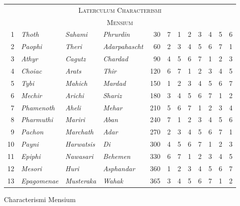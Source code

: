 %
\begin{tabnums} %
\normalsize
\centering
\renewcommand{\arraystretch}{1.0278} %
\newcommand{\hts}{\scriptsize}
\newcommand{\cwd}{4em}
%
\newcommand{\da}{\scriptsize{†}}
\begin{tabular}{@{} r lll r @{\hspace{2em}} ccccccc @{}}
\toprule
\multicolumn{12}{c}{\Large\textsc{Laterculum Characterismi}} \\
\multicolumn{12}{c}{\large\textsc{Mensium}} \\
\toprule
 1&\itshape Thoth      & \itshape Sahami     & \itshape Phrurdin
    &  30 & 7 & 1 & 2 & 3 & 4 & 5 & 6 \\
 2&\itshape Paophi     & \itshape Theri      & \itshape Adarpahascht
    &  60 & 2 & 3 & 4 & 5 & 6 & 7 & 1 \\
 3&\itshape Athyr      & \itshape Cagutz     & \itshape Chardad
    &  90 & 4 & 5 & 6 & 7 & 1 & 2 & 3 \\

 4&\itshape Choiac     & \itshape Arats      & \itshape Thir
    & 120 & 6 & 7 & 1 & 2 & 3 & 4 & 5 \\
 5&\itshape Tybi       & \itshape Mahich     & \itshape Mardad
    & 150 & 1 & 2 & 3 & 4 & 5 & 6 & 7 \\
 6&\itshape Mechir     & \itshape Arichi     & \itshape Shariz
    & 180 & 3 & 4 & 5 & 6 & 7 & 1 & 2 \\

 7&\itshape Phamenoth  & \itshape Aheli      & \itshape Mehar
    & 210 & 5 & 6 & 7 & 1 & 2 & 3 & 4 \\
 8&\itshape Pharmuthi  & \itshape Mariri     & \itshape Aban
    & 240 & 7 & 1 & 2 & 3 & 4 & 5 & 6 \\
 9&\itshape Pachon     & \itshape Marchath   & \itshape Adar
    & 270 & 2 & 3 & 4 & 5 & 6 & 7 & 1 \\

10&\itshape Payni      & \itshape Harwatsis  & \itshape Di
    & 300 & 4 & 5 & 6 & 7 & 1 & 2 & 3 \\
11&\itshape Epiphi     & \itshape Nawasari   & \itshape Behemen
    & 330 & 6 & 7 & 1 & 2 & 3 & 4 & 5 \\
12&\itshape Mesori     & \itshape Huri       & \itshape Asphandar
    & 360 & 1 & 2 & 3 & 4 & 5 & 6 & 7 \\
13&\itshape Epagomenae & \itshape Musteraka  & \itshape Wahak
    & 365 & 3 & 4 & 5 & 6 & 7 & 1 & 2 \\
\bottomrule
\end{tabular}
%
\caption{Characterismi Mensium}
\label{tab:p218a}
%
\end{tabnums}
